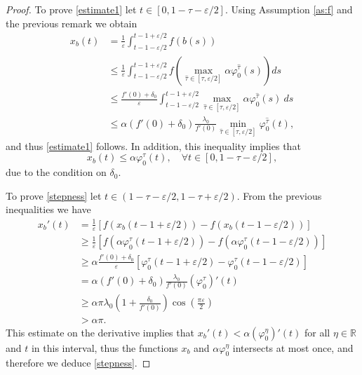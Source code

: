 \documentclass[a4paper,11pt]{article}
\theoremstyle{plain}
\theoremstyle{definition}
\theoremstyle{definition}
\newcommand{\R}{\mathbb{R}}
\numberwithin{equation}{section}
\begin{document}
\begin{proof}
To prove \eqref{estimate1} let $t\in [0,1-\tau-\varepsilon/2]$. Using Assumption \ref{as:f} and the previous remark we obtain
\begin{align*}
    x_b(t) &= \frac{1}{\varepsilon}\int_{t-1-\varepsilon/2}^{t-1+\varepsilon/2} f(b(s)) \\
    &\leq \frac{1}{\varepsilon}\int_{t-1-\varepsilon/2}^{t-1+\varepsilon/2} f\left( \max_{\hat{\tau}\in[\tau,\varepsilon/2]} \alpha \varphi_0^{\hat{\tau}} (s) \right) ds \\
    &\leq \frac{f'(0)+\delta_0}{\varepsilon}\int_{t-1-\varepsilon/2}^{t-1+\varepsilon/2} \max_{\hat{\tau}\in[\tau,\varepsilon/2]} \alpha \varphi_0^{\hat{\tau}} (s) ~ ds \\
    &\leq \alpha (f'(0) + \delta_0)\frac{\lambda_0}{f'(0)} \min_{\hat{\tau}\in[\tau,\varepsilon/2]} \varphi_0^{\hat{\tau}}(t),
\end{align*}
and thus \eqref{estimate1} follows. In addition, this inequality implies that
\begin{equation}\label{eq:inter-estimate}
    x_b(t) \leq \alpha\varphi_0^\tau(t), \quad \forall t\in[0,1-\tau-\varepsilon/2],
\end{equation}
due to the condition on $\delta_0$.

To prove \eqref{stepness} let $t\in(1-\tau-\varepsilon/2,1-\tau+\varepsilon/2)$. From the previous inequalities we have
\begin{align*}
    x_b'(t) &= \frac{1}{\varepsilon} [ f(x_b(t-1+\varepsilon/2)) - f(x_b(t-1-\varepsilon/2)) ] \\
    &\geq \frac{1}{\varepsilon} [f(\alpha\varphi_0^\tau(t-1+\varepsilon/2)) - f(\alpha\varphi_0^\tau(t-1-\varepsilon/2))] \\
    &\geq \alpha\frac{f'(0)+\delta_0}{\varepsilon} [\varphi_0^\tau(t-1+\varepsilon/2) - \varphi_0^\tau(t-1-\varepsilon/2)] \\
    &= \alpha (f'(0)+\delta_0)\frac{\lambda_0}{f'(0)} (\varphi_0^\tau)'(t) \\
    &\geq \alpha\pi\lambda_0\left( 1+\frac{\delta_0}{f'(0)} \right) \cos\left( \frac{\pi\varepsilon}{2} \right) \\
    &>\alpha\pi.
\end{align*}
This estimate on the derivative implies that $x_b'(t) < \alpha(\varphi_0^\eta)'(t)$ for all $\eta\in \R$ and $t$ in this interval, thus the functions $x_b$ and $\alpha\varphi_0^\eta$ intersects at most once, and therefore we deduce \eqref{stepness}.


\end{proof}
\end{document}
